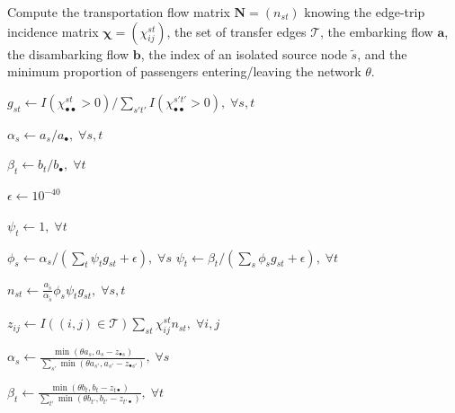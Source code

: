 \documentclass{bmcart}
\begin{document}
\begin{algorithm}[H]
	\caption{Compute the transportation flow matrix $\mathbf{N} = (n_{st})$ knowing the edge-trip incidence matrix $\bm{\chi} = (\chi_{ij}^{st})$, the set of transfer edges $\mathcal{T}$, the embarking flow $\mathbf{a}$, the disambarking flow $\mathbf{b}$, the index of an isolated source node $\tilde{s}$, and the minimum proportion of passengers entering/leaving the network $\theta$.}
	\label{algo1}
	\begin{algorithmic}[1]
		\State $g_{st} \leftarrow I(\chi_{\bullet \bullet}^{st} > 0) / \sum_{s't'}I(\chi_{\bullet \bullet}^{s't'} > 0), \; \forall s,t$ 
		
		\State $\alpha_s \leftarrow a_s / a_\bullet, \; \forall s,t$ 
		
		\State $\beta_t \leftarrow b_t / b_\bullet, \; \forall t$ 
		
		\State $\epsilon \leftarrow 10^{-40}$ 
		
		 
		
		\State $\psi_t \leftarrow 1, \; \forall t$
		
		 
		
		\State $\phi_s \leftarrow \alpha_s / (\sum_t \psi_t g_{st} + \epsilon), \; \forall s$
		\State $\psi_t \leftarrow \beta_t / (\sum_s \phi_s g_{st} + \epsilon), \; \forall t$
		
		\EndWhile
		
		\State $n_{st} \leftarrow \frac{a_{\tilde{s}}}{\alpha_{\tilde{s}}} \phi_s \psi_t g_{st}, \; \forall s,t$ 
		
		\State $z_{ij} \leftarrow I((i,j) \in \mathcal{T})\sum_{st} \chi_{ij}^{st} n_{st}, \; \forall i,j$
		
		\State $\alpha_s \leftarrow \frac{\min(\theta a_s, a_s - z_{\bullet s})}{\sum_{s'} \min(\theta a_{s'}, a_{s'} - z_{\bullet {s'}})}, \; \forall s$ 
		
		\State $\beta_t \leftarrow \frac{\min(\theta b_t, b_t - z_{t \bullet})}{\sum_{t'} \min(\theta b_{t'}, b_{t'} - z_{{t'} \bullet})}, \; \forall t$ 
		

\end{algorithmic}
\end{algorithm}
\end{document}
